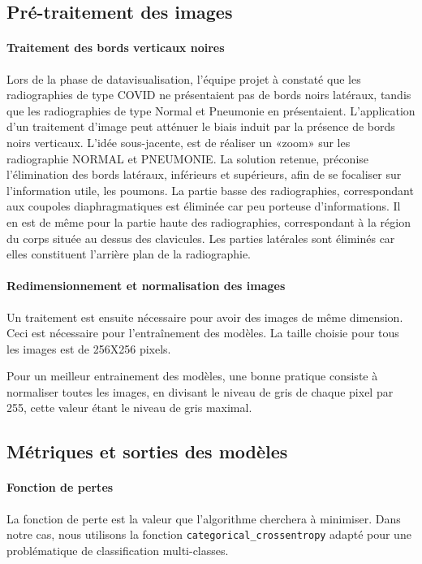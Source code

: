 \documentclass[11pt,twoside,openright]{article}
\def\code#1{\texttt{#1}}
\begin{document}
\subsection{Pré-traitement des images}

\paragraph{Traitement des bords verticaux noires} 

Lors de la phase de datavisualisation, l'équipe projet à constaté que les radiographies de type COVID ne présentaient pas de bords noirs latéraux, tandis que les radiographies de type Normal et Pneumonie en présentaient.  
L'application d'un traitement d'image peut atténuer le biais induit par la présence de bords noirs verticaux.
L'idée sous-jacente, est de réaliser un «zoom» sur les radiographie NORMAL et PNEUMONIE.
La solution retenue, préconise l'élimination des bords latéraux, inférieurs et supérieurs, afin de se focaliser sur l'information utile, les poumons. La partie basse des radiographies, correspondant aux coupoles diaphragmatiques est éliminée car peu porteuse d'informations. Il en est de même pour la partie haute des radiographies, correspondant à la région du corps située au dessus des clavicules. Les parties latérales sont éliminés car elles constituent l'arrière plan de la radiographie.

\paragraph{Redimensionnement et normalisation des images} 
Un traitement est ensuite nécessaire pour avoir des images de même dimension. Ceci est nécessaire pour l'entraînement des modèles. La taille choisie pour tous les images est de 256X256 pixels.

Pour un meilleur entrainement des modèles, une bonne pratique consiste à normaliser toutes les images,  en divisant le niveau de gris de chaque pixel par 255, cette valeur étant le niveau de gris maximal.

\subsection{Métriques et sorties des modèles}

\paragraph{Fonction de pertes}
La fonction de perte est la valeur que l'algorithme cherchera à minimiser. Dans notre cas, nous utilisons la fonction \code{categorical\_crossentropy} adapté pour une problématique de classification multi-classes. 
\end{document}
